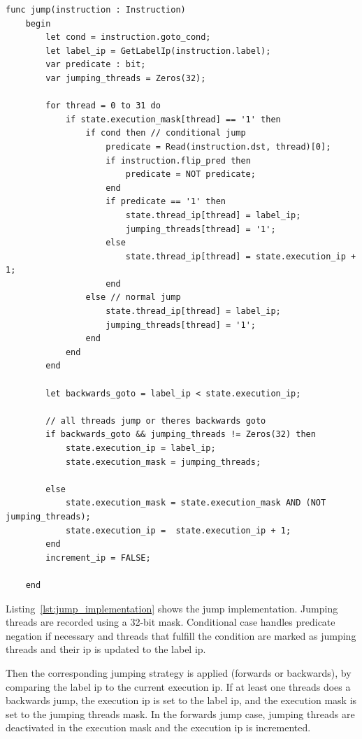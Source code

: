 \begin{lstlisting}[caption={Jump Instruction Implementation}, label={lst:jump_implementation}]
    func jump(instruction : Instruction)
    begin
        let cond = instruction.goto_cond;
        let label_ip = GetLabelIp(instruction.label);
        var predicate : bit;
        var jumping_threads = Zeros(32);
    
        for thread = 0 to 31 do
            if state.execution_mask[thread] == '1' then
                if cond then // conditional jump
                    predicate = Read(instruction.dst, thread)[0];
                    if instruction.flip_pred then
                        predicate = NOT predicate;
                    end
                    if predicate == '1' then
                        state.thread_ip[thread] = label_ip;
                        jumping_threads[thread] = '1';
                    else
                        state.thread_ip[thread] = state.execution_ip + 1;
                    end
                else // normal jump
                    state.thread_ip[thread] = label_ip;
                    jumping_threads[thread] = '1';
                end
            end
        end
    
        let backwards_goto = label_ip < state.execution_ip;
    
        // all threads jump or theres backwards goto
        if backwards_goto && jumping_threads != Zeros(32) then
            state.execution_ip = label_ip;
            state.execution_mask = jumping_threads;
            
        else
            state.execution_mask = state.execution_mask AND (NOT jumping_threads);
            state.execution_ip =  state.execution_ip + 1;
        end
        increment_ip = FALSE;
    
    end
\end{lstlisting}

 Listing~\ref{lst:jump_implementation} shows the jump implementation. Jumping
 threads are recorded using a 32-bit mask. Conditional case handles predicate
 negation if necessary and threads that fulfill the condition are marked as
 jumping threads and their ip is updated to the label ip.


Then the corresponding jumping strategy is applied (forwards or backwards), by
comparing the label ip to the current execution ip. If at least one threads
does a backwards jump, the execution ip is set to the label ip, and the
execution mask is set to the jumping threads mask. In the forwards jump case,
jumping threads are deactivated in the execution mask and the execution ip is
incremented.


